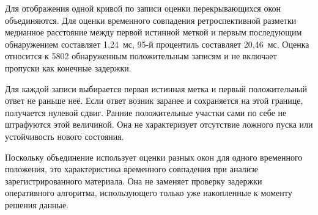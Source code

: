 Для отображения одной кривой по записи
оценки перекрывающихся окон объединяются.
Для оценки временного совпадения ретроспективной разметки
медианное расстояние
между первой истинной меткой и первым последующим
обнаружением составляет 1,24~мс,
95-й процентиль составляет 20,46~мс.
Оценка относится к 5802 обнаруженным
положительным записям и не включает пропуски
как конечные задержки.

Для каждой записи выбирается первая истинная метка
и первый положительный ответ не раньше неё.
Если ответ возник заранее и сохраняется на этой границе,
получается нулевой сдвиг. Ранние положительные участки
сами по себе не штрафуются этой величиной.
Она не характеризует отсутствие ложного пуска
или устойчивость нового состояния.

Поскольку объединение использует оценки
разных окон для одного временного положения,
это характеристика временного совпадения
при анализе зарегистрированного материала.
Она не заменяет проверку задержки
оперативного алгоритма, использующего
только уже накопленные к моменту решения данные.

